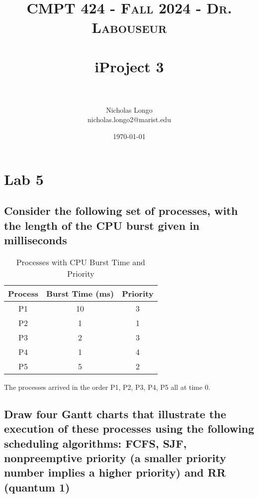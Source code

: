 \documentclass[letterpaper, 10pt,DIV=13]{scrartcl}
\title{	
   \normalfont \normalsize 
   \textsc{CMPT 424 - Fall 2024 - Dr. Labouseur} \\[10pt] %
   \horrule{0.5pt} \\[0.25cm] 	%
   \huge iProject 3  \\     	    %
   \horrule{0.5pt} \\[0.25cm] 	%
}
\author{Nicholas Longo \\ \normalsize nicholas.longo2@marist.edu}
\date{\normalsize\today} 	%
\numberwithin{equation}{section} %
\numberwithin{figure}{section} %
\numberwithin{table}{section} %
\begin{document}
\maketitle %

\section{Lab 5}

\subsection{Consider the following set of processes, with the length of the CPU burst given in milliseconds}
\begin{table}[h!]
    \centering
    \begin{tabular}{|c|c|c|}
        \hline
        \textbf{Process} & \textbf{Burst Time (ms)} & \textbf{Priority} \\
        \hline
        P1 & 10 & 3 \\
        \hline
        P2 & 1 & 1 \\
        \hline
        P3 & 2 & 3 \\
        \hline
        P4 & 1 & 4 \\
        \hline
        P5 & 5 & 2 \\
        \hline
    \end{tabular}
    \caption{Processes with CPU Burst Time and Priority}
    \label{tab:processes}
\end{table}

The processes arrived in the order P1, P2, P3, P4, P5 all at time 0. 

\subsection{Draw four Gantt charts that illustrate the execution of these processes using the following scheduling algorithms: FCFS, SJF, nonpreemptive priority (a smaller priority number implies a higher priority) and RR (quantum 1)}
\end{document}

